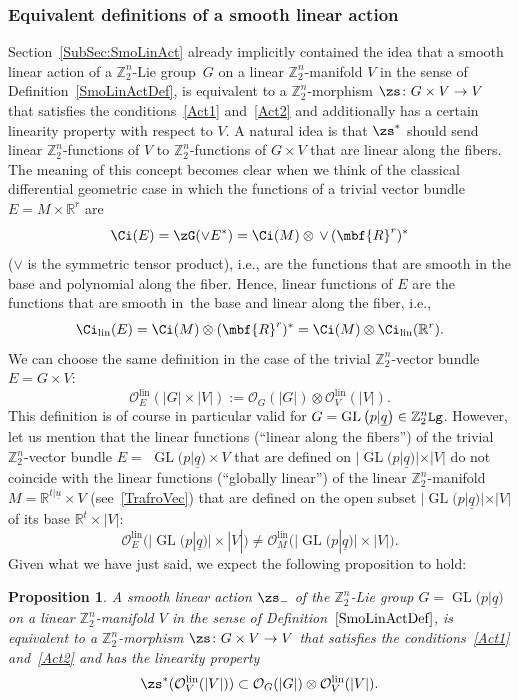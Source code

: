 \documentclass[10pt,a4paper]{amsart}
\newcommand{\op}[1]{\operatorname{#1}}
\newcommand{\R}{{\mathbb R}}
\newcommand{\Z}{{\mathbb Z}}
\def\ul{\underline}
\def\cO{\mathcal{O}}
\def\ul{\underline}
\newcommand{\0}{\otimes}
\newcommand{\z}{\Z_2^n}
\numberwithin{equation}{section}
\newtheorem{Proposition}[Theorem]{Proposition}
 { \theoremstyle{definition}
\newtheorem{Definition}[Theorem]{Definition}
\newtheorem{Example}[Theorem]{Example}
\newtheorem{Remark}[Theorem]{Remark} }
\begin{document}
\subsubsection{Equivalent definitions of a smooth linear action}
Section~\ref{SubSec:SmoLinAct} already implicitly contained the idea that a smooth linear action of a $\z$-Lie group~$G$ on a linear $\z$-manifold $V$ in the sense of Definition~\ref{SmoLinActDef}, is equivalent to a $\z$-morphism $\zs\colon G\times V\to V$ that satisfies the conditions~\eqref{Act1} and~\eqref{Act2} and additionally has a certain linearity property with respect to $V$. A natural idea is that $\zs^*$ should send linear $\z$-functions of $V$ to $\z$-functions of $G\times V$ that are linear along the fibers. The meaning of this concept becomes clear when we think of the classical differential geometric case in which the functions of a trivial vector bundle $E=M\times\R^r$ are
\[
\Ci(E)=\zG(\vee E^*)=\Ci(M)\otimes\,\vee\,(\mbf{R}^r)^*
\]
($\vee$ is the symmetric tensor product), i.e., are the functions that are smooth in the base and polynomial along the fiber. Hence, linear functions of $E$ are the functions that are smooth in~the base and linear along the fiber, i.e.,
\[
\Ci_{\op{lin}}(E)=\Ci(M)\otimes(\mbf{R}^r)^*=\Ci(M)\otimes\Ci_{\op{lin}}(\R^r).
\]
We can choose the same definition in the case of the trivial $\z$-vector bundle $E=G\times V$:
\[
\cO^{\op{lin}}_{E}(|G|\times|V|):=\cO_G(|G|)\otimes\cO^{\op{lin}}_V(|V|).
\]
This definition is of course in particular valid for $G=\op{GL}\big(p|\ul q\big)\in\z{\tt Lg}$. However, let us mention that the linear functions (``linear along the fibers'') of the trivial $\z$-vector bundle $E=$ \mbox{$\op{GL}\big(p|\ul q\big)\times V$} that are defined on $|\op{GL}\big(p|\ul q\big)|\times|V|$ do not coincide with the linear functions (``globally linear'') of the linear $\z$-manifold $M=\R^{t|\ul u}\times V$ (see~\eqref{TrafroVec}) that are defined on the open subset $|\op{GL}\big(p|\ul q\big)|\times |V|$ of its base $\R^t\times|V|$:
\[
\cO^{\op{lin}}_E\big(\big|\op{GL}\big(p|\ul q\big)\big|\times|V|\big)\neq \cO_M^{\op{lin}}\big(\big|\op{GL}\big(p|\ul q\big)\big|\times |V|\big).
\]
Given what we have just said, we expect the following proposition to hold:

\begin{Proposition}\label{EquivSmoLinActFunPtsMan} A smooth linear action $\zs_-$ of the $\z$-Lie group $G=\op{GL}\big(p|\ul q\big)$ on a linear $\z$-manifold $V$ in the sense of Definition~$\ref{SmoLinActDef}$, is equivalent to a $\z$-morphism $\zs\colon G\times V\to V$ that satisfies the conditions~\eqref{Act1} and~\eqref{Act2} and has the linearity property
\begin{gather}\label{LinCondActZMan}
\zs^*(\cO_V^{\op{lin}}(|V|))\subset \cO_{G}(|G|)\otimes\cO_V^{\op{lin}}(|V|).
\end{gather}
\end{Proposition}
\end{document}

